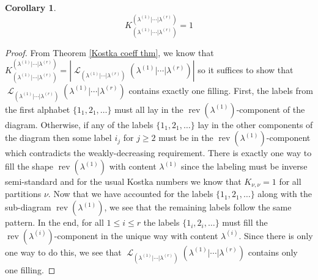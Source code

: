 \documentclass[12pt,reqno]{amsart}
\theoremstyle{definition}
\newtheorem{cor}[thm]{Corollary}
\DeclareMathOperator{\rev}{rev}
\DeclareMathOperator{\cL}{\mathcal{L}}
\begin{document}
\begin{cor}\label{leading coefficient is 1}
    $$K_{(\lambda^{(1)}|\cdots|\lambda^{(r)})}^{(\lambda^{(1)}|\cdots|\lambda^{(r)})} = 1$$
\end{cor}
\begin{proof}
    From Theorem \ref{Kostka coeff thm}, we know that $K_{(\lambda^{(1)}|\cdots|\lambda^{(r)})}^{(\lambda^{(1)}|\cdots|\lambda^{(r)})} = |\cL_{(\lambda^{(1)}|\cdots|\lambda^{(r)})}(\lambda^{(1)}|\cdots|\lambda^{(r)})|$ so it suffices to show that $\cL_{(\lambda^{(1)}|\cdots|\lambda^{(r)})}(\lambda^{(1)}|\cdots|\lambda^{(r)})$ contains exactly one filling. First, the labels from the first alphabet $\{1_1,2_1,\ldots\}$ must all lay in the $\rev(\lambda^{(1)})$-component of the diagram. Otherwise, if any of the labels $\{1_1,2_1,\ldots\}$ lay in the other components of the diagram then some label $i_j$ for $j \geq 2$ must be in the $\rev(\lambda^{(1)})$-component which contradicts the weakly-decreasing requirement. There is exactly one way to fill the shape $\rev(\lambda^{(1)})$ with content $\lambda^{(1)}$ since the labeling must be inverse semi-standard and for the usual Kostka numbers we know that $K_{\nu,\nu} =1$ for all partitions $\nu$. Now that we have accounted for the labels $\{1_1,2_1,\ldots\}$ along with the sub-diagram $\rev(\lambda^{(1)})$, we see that the remaining labels follow the same pattern. In the end, for all $1\leq i \leq r$ the labels $\{1_i,2_i,\ldots\}$ must fill the $\rev(\lambda^{(i)})$-component in the unique way with content $\lambda^{(i)}.$ Since there is only one way to do this, we see that $\cL_{(\lambda^{(1)}|\cdots|\lambda^{(r)})}(\lambda^{(1)}|\cdots|\lambda^{(r)})$ contains only one filling.
\end{proof}
\end{document}
